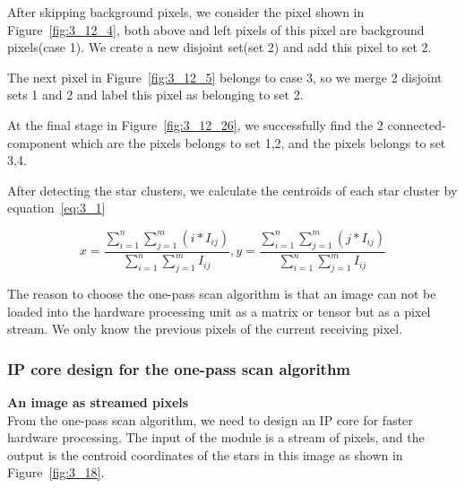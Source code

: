 
\noindent After skipping background pixels, we consider the pixel shown in Figure~\ref{fig:3_12_4}, both above and left pixels of this pixel are background pixels(case 1). We create a new disjoint set(set 2) and add this pixel to set 2. 


\noindent The next pixel in Figure~\ref{fig:3_12_5} belongs to case 3, so we merge 2 disjoint sets 1 and 2 and label this pixel as belonging to set 2. 


\noindent At the final stage in Figure~\ref{fig:3_12_26}, we successfully find the 2 connected-component which are the pixels belongs to set 1,2, and the pixels belongs to set 3,4.


\noindent After detecting the star clusters, we calculate the centroids of each star cluster by equation~\ref{eq:3_1}

\begin{equation}
	x = \frac{\displaystyle\sum_{i=1}^{n} \displaystyle\sum_{j=1}^{m} (i * I_{ij})} {\displaystyle\sum_{i=1}^{n} \displaystyle\sum_{j=1}^{m} I_{ij}}, y = \frac{\displaystyle\sum_{i=1}^{n} \displaystyle\sum_{j=1}^{m} (j * I_{ij})} {\displaystyle\sum_{i=1}^{n} \displaystyle\sum_{j=1}^{m} I_{ij}}
	\label{eq:3_1}
\end{equation}

\noindent The reason to choose the one-pass scan algorithm is that an image can not be loaded into the hardware processing unit as a matrix or tensor but as a pixel stream. We only know the previous pixels of the current receiving pixel.

\subsubsection{IP core design for the one-pass scan algorithm}

\textbf{An image as streamed pixels} \\
\noindent From the one-pass scan algorithm, we need to design an IP core for faster hardware processing. The input of the module is a stream of pixels, and the output is the centroid coordinates of the stars in this image as shown in Figure~\ref{fig:3_18}.

